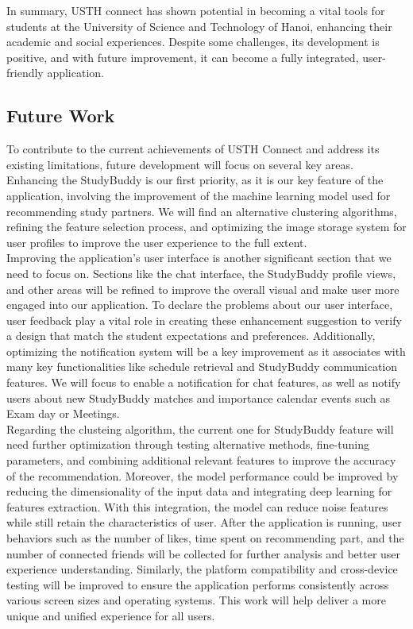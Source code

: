 \documentclass[12pt]{article}
\begin{document}
In summary, USTH connect has shown potential in becoming a vital tools for students at the University of Science and Technology of Hanoi, enhancing their academic and social experiences. 
Despite some challenges, its development is positive, and with future improvement, it can become a fully integrated, user-friendly application.

\subsection{Future Work}
To contribute to the current achievements of USTH Connect and address its existing limitations, future development will focus on several key areas. 
Enhancing the StudyBuddy is our first priority, as it is our key feature of the application, involving the improvement of the machine learning model used for recommending study partners.
We will find an alternative clustering algorithms, refining the feature selection process, and optimizing the image storage system for user profiles to improve the user experience to the full extent. \\

Improving the application's user interface is another significant section that we need to focus on. 
Sections like the chat interface, the StudyBuddy profile views, and other areas will be refined to improve the overall visual and make user more engaged into our application.
To declare the problems about our user interface, user feedback play a vital role in creating these enhancement suggestion to verify a design that match the student expectations and preferences.
Additionally, optimizing the notification system will be a key improvement as it associates with many key functionalities like schedule retrieval and StudyBuddy communication features.
We will focus to enable a notification for chat features, as well as notify users about new StudyBuddy matches and importance calendar events such as Exam day or Meetings. \\

Regarding the clusteing algorithm, the current one for StudyBuddy feature will need further optimization through testing alternative methods, fine-tuning parameters, and combining additional relevant features to improve the accuracy of the recommendation. Moreover, the model performance could be improved by reducing the dimensionality of the input data and integrating deep learning for features extraction. With this integration, the model can reduce noise features while still retain the characteristics of user. After the application is running, user behaviors such as the number of likes, time spent on recommending part, and the number of connected friends will be collected for further analysis and better user experience understanding. 
Similarly, the platform compatibility and cross-device testing will be improved to ensure the application performs consistently across various screen sizes and operating systems.
This work will help deliver a more unique and unified experience for all users. \\
\end{document}
